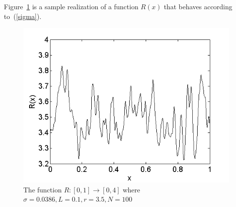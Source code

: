 Figure~\ref{fig:R} is a sample realization of a function $R(x)$ that
behaves according to~(\ref{sigma}).
\begin{figure}[!h]
\caption[The function $R(x)$]{The function $R:[0,1]\to [0,4]$ where
  $\sigma=0.0386, L=0.1, r=3.5, N=100$}\label{fig:R}
	\begin{center}
		\includegraphics[scale=0.6]{figs/xi.png}
	\end{center}
\end{figure}

